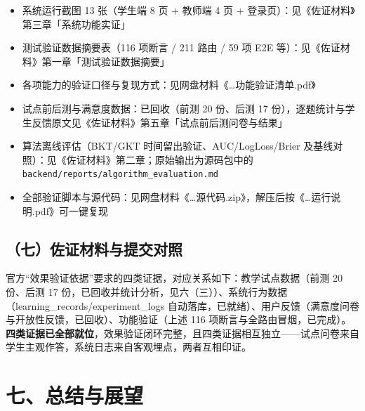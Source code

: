 \documentclass[zihao=-4,a4paper,UTF8,fontset=windows]{ctexart}
\begin{document}
\begin{itemize}[leftmargin=2em,itemsep=0pt,topsep=0pt]
\item 系统运行截图 13 张（学生端 8 页 + 教师端 4 页 + 登录页）：见《佐证材料》第三章「系统功能实证」
\end{itemize}
\begin{itemize}[leftmargin=2em,itemsep=0pt,topsep=0pt]
\item 测试验证数据摘要表（116 项断言 / 211 路由 / 59 项 E2E 等）：见《佐证材料》第一章「测试验证数据摘要」
\end{itemize}
\begin{itemize}[leftmargin=2em,itemsep=0pt,topsep=0pt]
\item 各项能力的验证口径与复现方式：见网盘材料《\dots{}功能验证清单.pdf》
\end{itemize}
\begin{itemize}[leftmargin=2em,itemsep=0pt,topsep=0pt]
\item 试点前后测与满意度数据：已回收（前测 20 份、后测 17 份），逐题统计与学生反馈原文见《佐证材料》第五章「试点前后测问卷与结果」
\end{itemize}
\begin{itemize}[leftmargin=2em,itemsep=0pt,topsep=0pt]
\item 算法离线评估（BKT/GKT 时间留出验证、AUC/LogLoss/Brier 及基线对照）：见《佐证材料》第二章；原始输出为源码包中的 \texttt{backend/reports/algorithm\_\allowbreak{}evaluation.\allowbreak{}md}
\end{itemize}
\begin{itemize}[leftmargin=2em,itemsep=0pt,topsep=0pt]
\item 全部验证脚本与源代码：见网盘材料《\dots{}源代码.zip》，解压后按《\dots{}运行说明.pdf》可一键复现
\end{itemize}
\subsection{（七）佐证材料与提交对照}


官方“效果验证依据”要求的四类证据，对应关系如下：教学试点数据（前测 20 份、后测 17 份，已回收并统计分析，见六（三））、系统行为数据（learning\_records/experiment\_logs 自动落库，已就绪）、用户反馈（满意度问卷与开放性反馈，已回收）、功能验证（上述 116 项断言与全路由冒烟，已完成）。\textbf{四类证据已全部就位}，效果验证闭环完整，且四类证据相互独立——试点问卷来自学生主观作答，系统日志来自客观埋点，两者互相印证。

\section{七、总结与展望}
\end{document}
